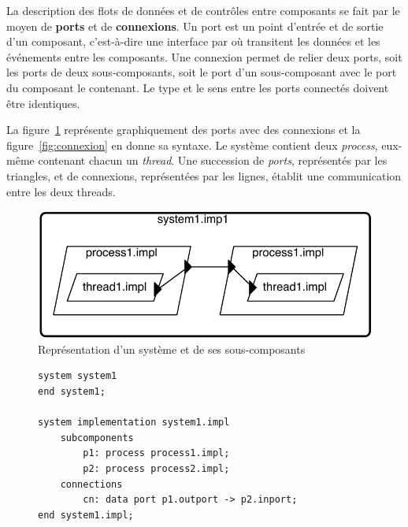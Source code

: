 \documentclass[11pt,a4paper]{paper}
\begin{document}
\begin{appendices}
La description des flots de données et de contrôles entre composants se fait par le moyen de {\bf ports} et de {\bf connexions}. Un port est un point d'entrée et de sortie d'un composant, c'est-à-dire une interface par où transitent les données et les événements entre les composants. Une connexion permet de relier deux ports, soit les ports de deux sous-composants, soit le port d'un sous-composant avec le port du composant le contenant. Le type et le sens entre les ports connectés doivent être identiques.

La figure~\ref{fig:connexion_graph} représente graphiquement des ports avec des connexions et la figure~\ref{fig:connexion} en donne sa syntaxe. Le système contient deux {\em process}, eux-même contenant chacun un {\em thread}. Une succession de {\em ports}, représentés par les triangles, et de connexions, représentées par les lignes, établit une communication entre les deux threads.

\begin{figure}[htbp]
\begin{center}
\includegraphics[scale=.6]{figures_pdf/connexion.pdf}
\caption{Représentation d'un système et de ses sous-composants}
\label{fig:connexion_graph}
\end{center}
\end{figure}

\begin{figure}[htbp]
\begin{center}
\begin{minipage}[c]{.46\linewidth}
\begin{lstlisting}
system system1
end system1;

system implementation system1.impl
    subcomponents
        p1: process process1.impl;
        p2: process process2.impl;
    connections
        cn: data port p1.outport -> p2.inport;
end system1.impl;


\end{lstlisting}
\end{minipage}
\end{center}
\end{figure}
\end{appendices}
\end{document}
